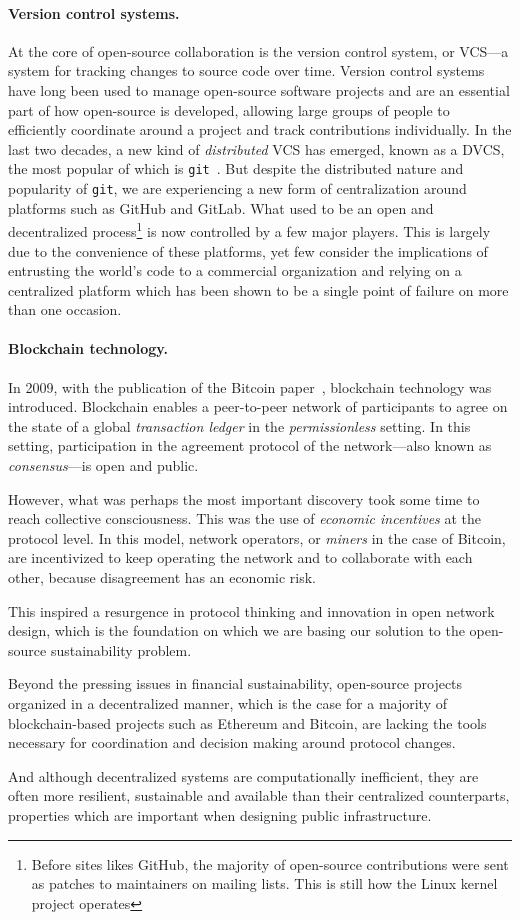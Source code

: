 \paragraph{Version control systems.} At the core of open-source collaboration
is the version control system, or VCS---a system for tracking changes to source
code over time. Version control systems have long been used to manage
open-source software projects and are an essential part of how open-source is
developed, allowing large groups of people to efficiently coordinate around a
project and track contributions individually. In the last two decades, a new
kind of \emph{distributed} VCS has emerged, known as a DVCS, the most popular
of which is \texttt{git}~\cite{git}. But despite the distributed nature
and popularity of \texttt{git}, we are experiencing a new form of
centralization around platforms such as GitHub and GitLab.  What used to be an
open and decentralized process\footnote{Before sites likes GitHub, the majority
of open-source contributions were sent as patches to maintainers on mailing
lists. This is still how the Linux kernel project operates} is now controlled
by a few major players. This is largely due to the convenience of these
platforms, yet few consider the implications of entrusting the world's code to
a commercial organization and relying on a centralized platform which has been
shown to be a single point of failure on more than one occasion.

\paragraph{Blockchain technology.} In 2009, with the publication of the Bitcoin
paper~\cite{bitcoin}, blockchain technology was introduced. Blockchain enables
a peer-to-peer network of participants to agree on the state of a global
\emph{transaction ledger} in the \emph{permissionless} setting. In this
setting, participation in the agreement protocol of the network---also known as
\emph{consensus}---is open and public.

However, what was perhaps the most important discovery took some time to reach
collective consciousness. This was the use of \emph{economic incentives} at the
protocol level. In this model, network operators, or \emph{miners} in the
case of Bitcoin, are incentivized to keep operating the network and to
collaborate with each other, because disagreement has an economic risk.

This inspired a resurgence in protocol thinking and innovation in open network
design, which is the foundation on which we are basing our solution to the
open-source sustainability problem.

Beyond the pressing issues in financial sustainability, open-source projects
organized in a decentralized manner, which is the case for a majority of
blockchain-based projects such as Ethereum and Bitcoin, are lacking the tools
necessary for coordination and decision making around protocol changes.

And although decentralized systems are computationally inefficient, they are
often more resilient, sustainable and available than their centralized
counterparts, properties which are important when designing public
infrastructure.

